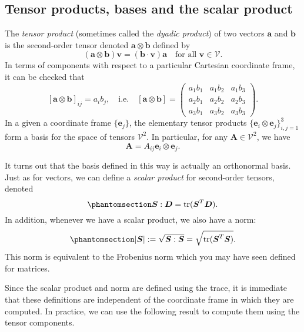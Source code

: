 \documentclass[
  letterpaper,
  DIV=11,
  numbers=noendperiod]{scrreprt}
\theoremstyle{plain}
\theoremstyle{remark}
\begin{document}
\subsection{Tensor products, bases and the scalar
product}\label{tensor-products-bases-and-the-scalar-product}

The \emph{tensor product} (sometimes called the \emph{dyadic product})
of two vectors \({\boldsymbol{a}}\) and \({\boldsymbol{b}}\) is the
second-order tensor denoted \({\boldsymbol{a}}\otimes{\boldsymbol{b}}\)
defined by
\[({\boldsymbol{a}}\otimes{\boldsymbol{b}}){\boldsymbol{v}}= ({\boldsymbol{b}}\cdot{\boldsymbol{v}}){\boldsymbol{a}}\quad\text{for all }{\boldsymbol{v}}\in{\mathcal{V}}.\]
In terms of components with respect to a particular Cartesian coordinate
frame, it can be checked that
\[[{\boldsymbol{a}}\otimes {\boldsymbol{b}}]_{ij} = a_ib_j,\quad\text{i.e.}\quad [{\boldsymbol{a}}\otimes{\boldsymbol{b}}] =
  \left(
    \begin{array}{ccc}
      a_1b_1 & a_1b_2 & a_1b_3 \\
      a_2b_1 & a_2b_2 & a_2b_3 \\
      a_3b_1 & a_3b_2 & a_3b_3
    \end{array}\right).\] In a given a coordinate frame
\(\{{\boldsymbol{e}}_j\}\), the elementary tensor products
\(\{{\boldsymbol{e}}_i\otimes{\boldsymbol{e}}_j\}_{i,j=1}^3\) form a
basis for the space of tensors \({\mathcal{V}}^2\). In particular, for
any \({\boldsymbol{A}}\in{\mathcal{V}}^2\), we have \[
{\boldsymbol{A}}= A_{ij}{\boldsymbol{e}}_i\otimes{\boldsymbol{e}}_j.
\]

It turns out that the basis defined in this way is actually an
orthonormal basis. Just as for vectors, we can define a \emph{scalar
product} for second-order tensors, denoted
\begin{equation}\phantomsection\label{eq-scalarproduct2ndorder}{
  {\boldsymbol{S}}:{\boldsymbol{D}}= {\operatorname{tr}}({\boldsymbol{S}}^T{\boldsymbol{D}}).
}\end{equation} In addition, whenever we have a scalar product, we also
have a norm: \begin{equation}\phantomsection\label{eq-norm2ndorder}{
  |{\boldsymbol{S}}|:=\sqrt{{\boldsymbol{S}}:{\boldsymbol{S}}} = \sqrt{{\operatorname{tr}}({\boldsymbol{S}}^T{\boldsymbol{S}})}.
}\end{equation} This norm is equivalent to the Frobenius norm which you
may have seen defined for matrices.

Since the scalar product and norm are defined using the trace, it is
immediate that these definitions are independent of the coordinate frame
in which they are computed. In practice, we can use the following result
to compute them using the tensor components.
\end{document}
